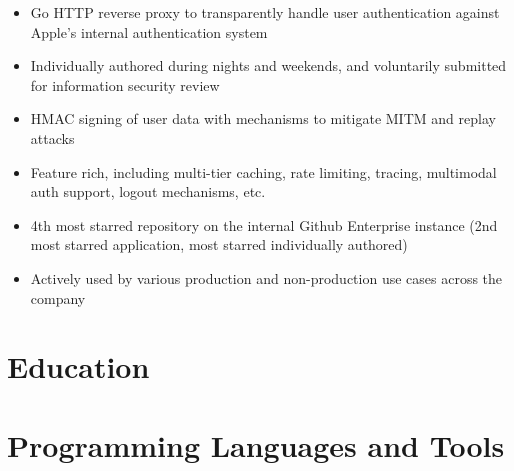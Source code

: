 \documentclass[11pt,letterpaper,sans]{moderncv}        %
\begin{document}
\begin{itemize}
\item Go HTTP reverse proxy to transparently handle user authentication against Apple's internal authentication system
\item Individually authored during nights and weekends, and voluntarily submitted for information security review
\item HMAC signing of user data with mechanisms to mitigate MITM and replay attacks
\item Feature rich, including multi-tier caching, rate limiting, tracing, multimodal auth support, logout mechanisms, etc.
\item 4th most starred repository on the internal Github Enterprise instance (2nd most starred application, most starred individually authored)
\item Actively used by various production and non-production use cases across the company
\end{itemize}

\section{Education}

\section{Programming Languages and Tools}
\begin{cvcolumns}
\end{cvcolumns}
\end{document}
